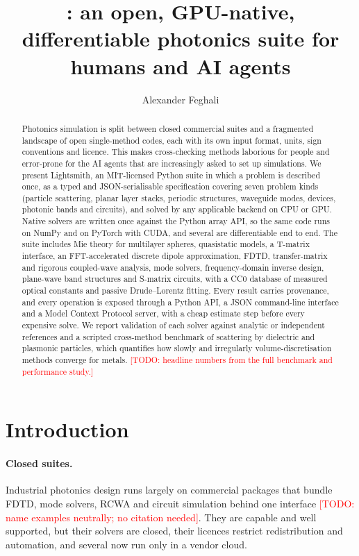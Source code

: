 \documentclass[11pt]{article}
\title{\LS: an open, GPU-native, differentiable photonics suite for humans and AI agents}
\author{Alexander Feghali\\ \small \todo{affiliation}}
\date{\todo{date}}
\newcommand{\todo}[1]{\textcolor{red}{[TODO: #1]}}
\newcommand{\LS}{Lightsmith}
\begin{document}
\maketitle

\begin{abstract}
Photonics simulation is split between closed commercial suites and a fragmented landscape of
open single-method codes, each with its own input format, units, sign conventions and licence.
This makes cross-checking methods laborious for people and error-prone for the AI agents that are
increasingly asked to set up simulations. We present \LS{}, an MIT-licensed Python suite in which a
problem is described once, as a typed and JSON-serialisable specification covering seven problem
kinds (particle scattering, planar layer stacks, periodic structures, waveguide modes, devices,
photonic bands and circuits), and solved by any applicable backend on CPU or GPU. Native solvers
are written once against the Python array API, so the same code runs on NumPy and on PyTorch with
CUDA, and several are differentiable end to end. The suite includes Mie theory for multilayer
spheres, quasistatic models, a T-matrix interface, an FFT-accelerated discrete dipole approximation,
FDTD, transfer-matrix and rigorous coupled-wave analysis, mode solvers, frequency-domain inverse
design, plane-wave band structures and S-matrix circuits, with a CC0 database of measured optical
constants and passive Drude--Lorentz fitting. Every result carries provenance, and every
operation is exposed through a Python API, a JSON command-line interface and a Model Context
Protocol server, with a cheap estimate step before every expensive solve. We report validation of
each solver against analytic or independent references and a scripted cross-method benchmark of
scattering by dielectric and plasmonic particles, which quantifies how slowly and irregularly
volume-discretisation methods converge for metals. \todo{headline numbers from the full benchmark
and performance study.}
\end{abstract}

\section{Introduction}
\label{sec:intro}

\paragraph{Closed suites.} Industrial photonics design runs largely on commercial packages
that bundle FDTD, mode solvers, RCWA and circuit simulation behind one interface \todo{name
examples neutrally; no citation needed}. They are capable and well supported, but their solvers
are closed, their licences restrict redistribution and automation, and several now run only in a
vendor cloud.
\end{document}
